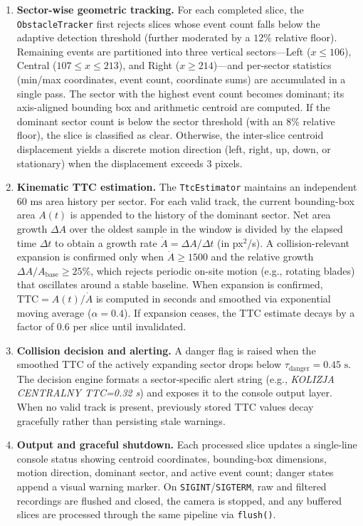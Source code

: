 \documentclass[conference]{IEEEtran}
\begin{document}
\begin{enumerate}
    \item \textbf{Sector-wise geometric tracking.} For each completed slice, the \texttt{ObstacleTracker} first rejects slices whose event count falls below the adaptive detection threshold (further moderated by a $12\%$ relative floor). Remaining events are partitioned into three vertical sectors---Left ($x \leq 106$), Central ($107 \leq x \leq 213$), and Right ($x \geq 214$)---and per-sector statistics (min/max coordinates, event count, coordinate sums) are accumulated in a single pass. The sector with the highest event count becomes dominant; its axis-aligned bounding box and arithmetic centroid are computed. If the dominant sector count is below the sector threshold (with an $8\%$ relative floor), the slice is classified as clear. Otherwise, the inter-slice centroid displacement yields a discrete motion direction (left, right, up, down, or stationary) when the displacement exceeds $3$ pixels.

    \item \textbf{Kinematic TTC estimation.} The \texttt{TtcEstimator} maintains an independent $60\text{ ms}$ area history per sector. For each valid track, the current bounding-box area $A(t)$ is appended to the history of the dominant sector. Net area growth $\Delta A$ over the oldest sample in the window is divided by the elapsed time $\Delta t$ to obtain a growth rate $\dot{A} = \Delta A / \Delta t$ (in px$^2$/s). A collision-relevant expansion is confirmed only when $\dot{A} \geq 1500$ and the relative growth $\Delta A / A_{\text{base}} \geq 25\%$, which rejects periodic on-site motion (e.g., rotating blades) that oscillates around a stable baseline. When expansion is confirmed, $\text{TTC} = A(t) / \dot{A}$ is computed in seconds and smoothed via exponential moving average ($\alpha = 0.4$). If expansion ceases, the TTC estimate decays by a factor of $0.6$ per slice until invalidated.

    \item \textbf{Collision decision and alerting.} A danger flag is raised when the smoothed TTC of the actively expanding sector drops below $\tau_{\text{danger}} = 0.45\text{ s}$. The decision engine formats a sector-specific alert string (e.g., \textit{KOLIZJA CENTRALNY TTC=0.32 s}) and exposes it to the console output layer. When no valid track is present, previously stored TTC values decay gracefully rather than persisting stale warnings.

    \item \textbf{Output and graceful shutdown.} Each processed slice updates a single-line console status showing centroid coordinates, bounding-box dimensions, motion direction, dominant sector, and active event count; danger states append a visual warning marker. On \texttt{SIGINT}/\texttt{SIGTERM}, raw and filtered recordings are flushed and closed, the camera is stopped, and any buffered slices are processed through the same pipeline via \texttt{flush()}.
\end{enumerate}
\end{document}
